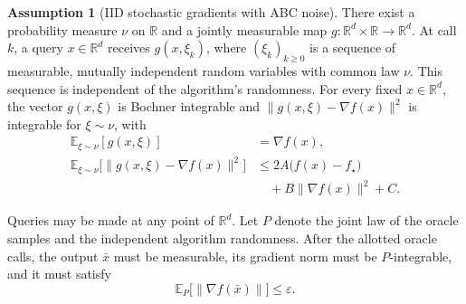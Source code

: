 \documentclass[10pt]{article}
\theoremstyle{definition}
\newtheorem{assumption}{Assumption}
\begin{document}
\begin{assumption}[IID stochastic gradients with ABC noise]
There exist a probability measure $\nu$ on $\mathbb{R}$ and a jointly measurable map
$g:\mathbb{R}^d\times\mathbb{R}\to\mathbb{R}^d$.
At call $k$, a query $x\in\mathbb{R}^d$ receives $g(x,\xi_k)$, where $(\xi_k)_{k\geq0}$ is a sequence of measurable, mutually independent random variables with common law $\nu$. This sequence is independent of the algorithm's randomness.
For every fixed $x\in\mathbb{R}^d$, the vector $g(x,\xi)$ is Bochner integrable and $\|g(x,\xi)-\nabla f(x)\|^2$ is integrable for $\xi\sim\nu$, with
\[
\begin{aligned}
\mathbb{E}_{\xi\sim\nu}[g(x,\xi)]&=\nabla f(x),\\
\mathbb{E}_{\xi\sim\nu}\bigl[\|g(x,\xi)-\nabla f(x)\|^2\bigr]
&\leq 2A\bigl(f(x)-f_\star\bigr)\\
&\quad+B\|\nabla f(x)\|^2+C.
\end{aligned}
\]
\end{assumption}

Queries may be made at any point of $\mathbb{R}^d$. Let $P$ denote the joint law of the oracle samples and the independent algorithm randomness. After the allotted oracle calls, the output $\bar{x}$ must be measurable, its gradient norm must be $P$-integrable, and it must satisfy
\[
\mathbb{E}_{P}\bigl[\|\nabla f(\bar{x})\|\bigr]\leq\varepsilon.
\]
\end{document}
